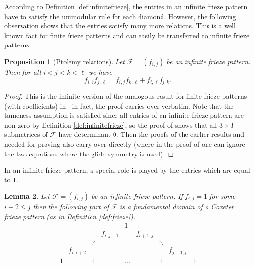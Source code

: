 \documentclass[11pt,a4paper]{amsart}
\newtheorem{Lemma}{Lemma}[section]
\newtheorem{Proposition}[Lemma]{Proposition}
\theoremstyle{definition}
\numberwithin{equation}{section}
\begin{document}
According to Definition \ref{def:infinitefrieze}, the entries in an infinite frieze pattern have to satisfy 
the unimodular rule for each diamond. However, the following observation shows that the entries satisfy
many more relations. This is a well known fact for finite frieze patterns and can easily be transferred 
to infinite frieze patterns. 

\begin{Proposition}[Ptolemy relations] \label{prop:Ptolemy}
Let $\mathcal{F}=(f_{i,j})$ be an infinite frieze pattern. Then for all $i< j < k< \ell$ we have
$$f_{i,k}f_{j,\ell} = f_{i,j} f_{k,\ell} + f_{i,\ell} f_{j,k}.
$$
\end{Proposition} 

\begin{proof}
This is the infinite version of the analogous result for finite frieze patterns (with coefficients)
in \cite[Thm. 3.3]{CHJ20}; in fact, the proof carries over verbatim. Note that the 
tameness assumption is satisfied since all entries of an infinite frieze pattern are non-zero by Definition
\ref{def:infinitefrieze}, so the proof of \cite[Prop. 2.6]{CHJ20} shows that all $3\times 3$-submatrices
of $\mathcal{F}$ have determinant 0. Then the proofs of the earlier results \cite[Prop. 2.10\,(1)]{CHJ20}
and \cite[Cor. 2.11\,(1)]{CHJ20} needed for proving \cite[Thm. 3.3]{CHJ20} also carry over directly
(where in the proof of \cite[Prop. 2.10\,(1)]{CHJ20} one can ignore the two equations where the glide
symmetry is used). 
\end{proof}


In an infinite frieze pattern, a special role is played by the entries which are equal to 1. 


\begin{Lemma} \label{lem:fund}
Let $\mathcal{F}=(f_{i,j})$ be an infinite frieze pattern. If $f_{i,j}=1$ for some $i+2\le j$ then 
the following part of $\mathcal{F}$ is a fundamental domain of a Coxeter frieze pattern (as in 
Definition \ref{def:frieze}). 
$$\begin{array}{ccccccccc}
 & & & & 1 & & & & \\
 & & & f_{i,j-1} & & f_{i+1,j} & & & \\
  & & \iddots & & &  & \ddots & & \\
 & f_{i,i+2} & & & & & & f_{j-1,j} & \\
 1 & & 1 &  & \ldots  & & 1 &  & 1 \\
 \end{array}
 $$
\end{Lemma}
\end{document}

